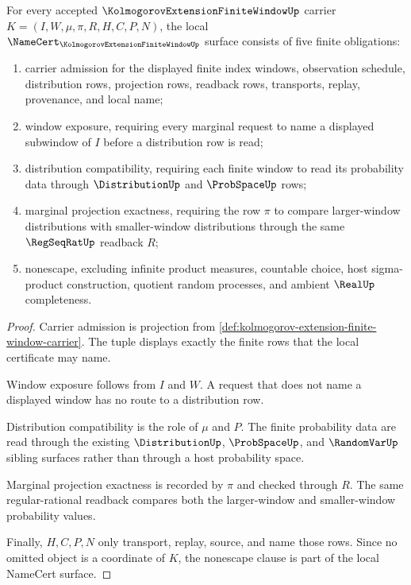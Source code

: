 \begin{theorem}
\label{thm:kolmogorov-extension-finite-window-namecert-obligations}
For every accepted $\KolmogorovExtensionFiniteWindowUp$ carrier $K=(I,W,\mu,\pi,R,H,C,P,N)$, the local $\NameCert_{\KolmogorovExtensionFiniteWindowUp}$ surface consists of five finite obligations:
\begin{enumerate}
\item carrier admission for the displayed finite index windows, observation schedule, distribution rows, projection rows, readback rows, transports, replay, provenance, and local name;
\item window exposure, requiring every marginal request to name a displayed subwindow of $I$ before a distribution row is read;
\item distribution compatibility, requiring each finite window to read its probability data through $\DistributionUp$ and $\ProbSpaceUp$ rows;
\item marginal projection exactness, requiring the row $\pi$ to compare larger-window distributions with smaller-window distributions through the same $\RegSeqRatUp$ readback $R$;
\item nonescape, excluding infinite product measures, countable choice, host sigma-product construction, quotient random processes, and ambient $\RealUp$ completeness.
\end{enumerate}
\end{theorem}
\begin{proof}
Carrier admission is projection from \autoref{def:kolmogorov-extension-finite-window-carrier}. The tuple displays exactly the finite rows that the local certificate may name.

Window exposure follows from $I$ and $W$. A request that does not name a displayed window has no route to a distribution row.

Distribution compatibility is the role of $\mu$ and $P$. The finite probability data are read through the existing $\DistributionUp$, $\ProbSpaceUp$, and $\RandomVarUp$ sibling surfaces rather than through a host probability space.

Marginal projection exactness is recorded by $\pi$ and checked through $R$. The same regular-rational readback compares both the larger-window and smaller-window probability values.

Finally, $H,C,P,N$ only transport, replay, source, and name those rows. Since no omitted object is a coordinate of $K$, the nonescape clause is part of the local NameCert surface.
\end{proof}

